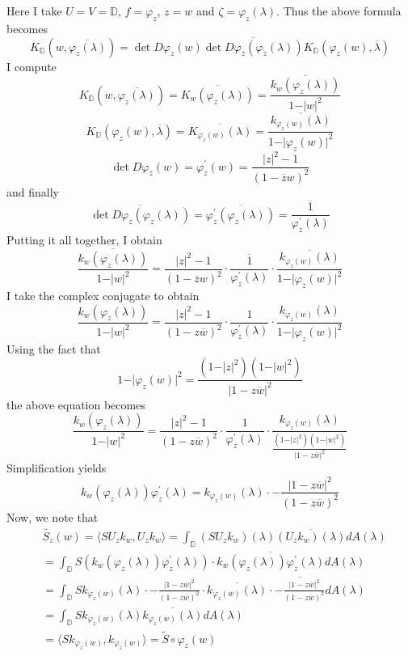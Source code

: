 \documentclass[12pt]{article}
\begin{document}
 Here I take $U = V = \mathbb{D}$, $f = \varphi_z$, $z = w$ and $\zeta = \varphi_z(\lambda)$. Thus the above formula becomes 
 \[
 K_\mathbb{D}(w,\overline{\varphi_z(\lambda)}) = \det D \varphi_z(w) \overline{\det D \varphi_z(\varphi_z(\lambda))} K_\mathbb{D}(\varphi_z(w), \overline{\lambda})
 \] I compute 
 \[
 K_\mathbb{D}(w,\overline{\varphi_z(\lambda)}) = \overline{K_w(\varphi_z(\lambda))} = \overline{\frac{k_w(\varphi_z(\lambda))}{1 - \vert w \vert^2}}
 \] 
 \[
 K_\mathbb{D}(\varphi_z(w), \overline{\lambda}) = \overline{K_{\varphi_z(w)}(\lambda)} = \overline{\frac{k_{\varphi_z(w)}(\lambda)}{1- \vert \varphi_z(w) \vert^2}}
 \] 
 \[
 \det D \varphi_z(w) = \varphi_z^\prime(w) = \frac{\vert z \vert^2 - 1}{(1-\overline{z}w)^2}
 \] and finally 
 \[
 \overline{\det D \varphi_z(\varphi_z(\lambda))} = \overline{\varphi_z^\prime(\varphi_z(\lambda))} = \overline{\frac{1}{\varphi_z^\prime(\lambda)}}
 \] Putting it all together, I obtain 
 \[\overline{\frac{k_w(\varphi_z(\lambda))}{1 - \vert w \vert^2}} =  \frac{\vert z \vert^2 - 1}{(1-\overline{z}w)^2} \cdot  \overline{\frac{1}{\varphi_z^\prime(\lambda)}} \cdot  \overline{\frac{k_{\varphi_z(w)}(\lambda)}{1- \vert \varphi_z(w) \vert^2}}
 \] I take the complex conjugate to obtain 
 \[
 \frac{k_w(\varphi_z(\lambda))}{1 - \vert w \vert^2} =  \frac{\vert z \vert^2 - 1}{(1-z\overline{w})^2} \cdot  \frac{1}{\varphi_z^\prime(\lambda)} \cdot  \frac{k_{\varphi_z(w)}(\lambda)}{1- \vert \varphi_z(w) \vert^2}
\] Using the fact that 
\[
1 - \vert \varphi_z(w)\vert^2 = \frac{(1-\vert z \vert^2)(1- \vert w \vert^2)}{\vert 1 - z \overline{w} \vert^2}
\] the above equation becomes 
\[
\frac{k_w(\varphi_z(\lambda))}{1 - \vert w \vert^2} =  \frac{\vert z \vert^2 - 1}{(1-z\overline{w})^2} \cdot  \frac{1}{\varphi_z^\prime(\lambda)} \cdot  \frac{k_{\varphi_z(w)}(\lambda)}{\frac{(1-\vert z \vert^2)(1- \vert w \vert^2)}{\vert 1 - z \overline{w} \vert^2}}
\] Simplification yields 
\[
k_w(\varphi_z(\lambda)) \varphi_z^\prime(\lambda) = k_{\varphi_z(w)}(\lambda) \cdot -\frac{\vert 1- z \overline{w} \vert^2}{(1 - z \overline{w})^2}
\] Now, we note that
\begin{align*}
&\widetilde{S_z}(w) = \langle SU_z k_w,  U_z k_w\rangle = \int_\mathbb{D} (SU_z k_w)(\lambda) \overline{(U_z k_w)(\lambda)} dA(\lambda) \\
&= \int_\mathbb{D} S(k_w(\varphi_z(\lambda)) \varphi_z^\prime(\lambda)) \cdot \overline{k_w(\varphi_z(\lambda)) \varphi_z^\prime(\lambda)} dA(\lambda) \\
&=  \int_\mathbb{D} Sk_{\varphi_z(w)}(\lambda) \cdot -\frac{\vert 1- z \overline{w} \vert^2}{(1 - z \overline{w})^2} \cdot \overline{k_{\varphi_z(w)}(\lambda)} \cdot  \overline{-\frac{\vert 1- z \overline{w} \vert^2}{(1 - z \overline{w})^2}} dA(\lambda) \\
&= \int_\mathbb{D} Sk_{\varphi_z(w)}(\lambda) \overline{k_{\varphi_z(w)}(\lambda)} dA(\lambda)\\  
&= \langle Sk_{\varphi_z(w)}, k_{\varphi_z(w)} \rangle = \tilde{S} \circ \varphi_z (w) 
\end{align*}
\end{document}
